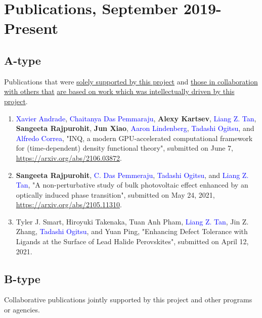 \section{Publications, September 2019-Present}
\label{sec:publications}

\subsection{A-type}
Publications that were \underline{solely supported by this project} and \underline{those in collaboration with others that} \underline{are based on work which was intellectually driven by this project}.
\begin{enumerate}
    \item \textcolor{blue}{Xavier Andrade}, \textcolor{blue}{Chaitanya Das Pemmaraju}, {\bf Alexy Kartsev}, \textcolor{blue}{Liang Z. Tan}, {\bf Sangeeta Rajpurohit}, {\bf Jun Xiao},  \textcolor{blue}{Aaron Lindenberg}, \textcolor{blue}{Tadashi Ogitsu}, and \textcolor{blue}{Alfredo Correa}, "INQ, a modern GPU-accelerated computational framework for (time-dependent) density functional theory", submitted on June 7, \url{https://arxiv.org/abs/2106.03872}.
    \item {\bf Sangeeta Rajpurohit}, \textcolor{blue}{C. Das Pemmeraju}, \textcolor{blue}{Tadashi Ogitsu}, and \textcolor{blue}{Liang Z. Tan}, "A non-perturbative study of bulk photovoltaic effect enhanced by an optically induced phase transition", submitted on May 24, 2021, \url{https://arxiv.org/abs/2105.11310}.
    \item Tyler J. Smart, Hiroyuki Takenaka, Tuan Anh Pham, \textcolor{blue}{Liang Z. Tan}, Jin Z. Zhang, \textcolor{blue}{Tadashi Ogitsu}, and Yuan Ping, "Enhancing Defect Tolerance with Ligands at the Surface of Lead Halide Perovskites", submitted on April 12, 2021.
\end{enumerate}

\subsection{B-type}

Collaborative publications jointly supported by this project and other programs or agencies.


